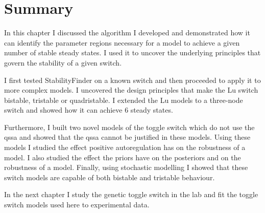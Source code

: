 \section{Summary}

In this chapter I discussed the algorithm I developed and demonstrated how it can identify the parameter regions necessary for a model to achieve a given number of stable steady states. I used it to uncover the underlying principles that govern the stability of a given switch. 

I first tested StabilityFinder on a known switch and then proceeded to apply it to more complex models. I uncovered the design principles that make the Lu switch bistable, tristable or quadristable. I extended the Lu models to a three-node switch and showed how it can achieve 6 steady states. 

Furthermore, I built two novel models of the toggle switch which do not use the \acrshort{qssa} and showed that the \acrshort{qssa} cannot be justified in these models. Using these models I studied the effect positive autoregulation has on the robustness of a model. I also studied the effect the priors have on the posteriors and on the robustness of a model. Finally, using stochastic modelling I showed that these switch models are capable of both bistable and tristable behaviour. 

In the next chapter I study the genetic toggle switch in the lab and fit the toggle switch models used here to experimental data. 




